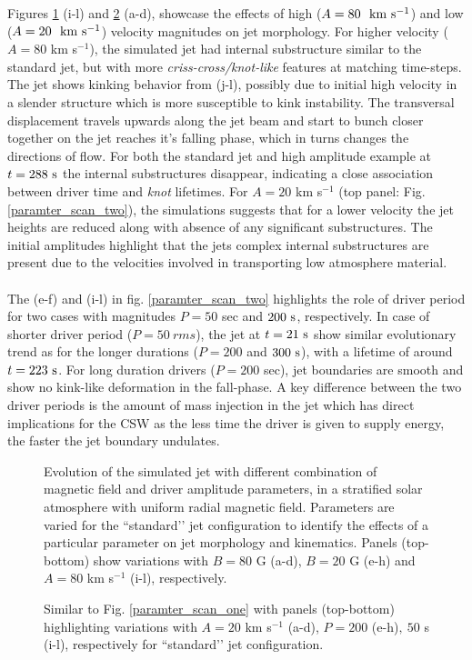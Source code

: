 \documentclass[12pt]{ociamthesis}
\newcommand{\fref}[1]{Fig. \eqref{#1}}
\newcommand{\kms}{~\rm{km ~s^{-1}}}
\newcommand{\np}{\\ \\}
\begin{document}
Figures \ref{paramter_scan_one} (i-l) and \ref{paramter_scan_two} (a-d), showcase the effects of high ($A = 80 ~\kms$) and low ($A = 20 ~\kms$) velocity magnitudes on jet morphology. For higher velocity ($A = 80$ km s$^{-1}$), the simulated jet had internal substructure similar to the standard jet, but with more \textit{criss-cross/knot-like} features at matching time-steps. The jet shows kinking behavior from (j-l), possibly due to initial high velocity in a slender structure which is more susceptible to kink instability. The transversal displacement travels upwards along the jet beam and start to bunch closer together on the jet reaches it's falling phase, which in turns changes the directions of flow. For both the standard jet and high amplitude example at $t = 288 ~\rm{s}$ the internal substructures disappear, indicating a close association between driver time and \textit{knot} lifetimes. For $A = 20$ km s$^{-1}$ (top panel: \fref{paramter_scan_two}), the simulations suggests that for a lower velocity the jet heights are reduced along with absence of any significant substructures. The initial amplitudes highlight that the jets complex internal substructures are present due to the velocities involved in transporting low atmosphere material. \np

The (e-f) and (i-l) in fig. \eqref{paramter_scan_two} highlights the role of driver period for two cases with magnitudes $P = 50$ sec and $200~\rm{s}$, respectively. In case of shorter driver period ($P = 50 ~rm{s}$), the jet at $t = 21~\rm{s}$ show similar evolutionary trend as for the longer durations ($P = 200$ and $300~\rm{s}$), with a lifetime of around $t = 223~\rm{s}$. For long duration drivers ($P = 200$ sec), jet boundaries are smooth and show no kink-like deformation in the fall-phase. A key difference between the two driver periods is the amount of mass injection in the jet which has direct implications for the CSW as the less time the driver is given to supply energy, the faster the jet boundary undulates.  
\begin{figure}
\captionsetup[subfigure]{labelformat=empty}
\centering
{} 
\caption{Evolution of the simulated jet with different combination of magnetic field and driver amplitude parameters, in a stratified solar atmosphere with uniform radial magnetic field. Parameters are varied for the ``standard’’ jet configuration to identify the effects of a particular parameter on jet morphology and kinematics. Panels (top-bottom) show variations with $B = 80$ G (a-d), $B = 20$ G  (e-h) and $A = 80$ km s$^{-1}$ (i-l), respectively.}
\label{paramter_scan_one}
\end{figure}
\begin{figure}
\captionsetup[subfigure]{labelformat=empty}
\centering
{} 
\caption{Similar to \fref{paramter_scan_one} with panels (top-bottom) highlighting variations with $A = 20$ km s$^{-1}$ (a-d), $P = 200$ (e-h)$,~50$ s (i-l), respectively for ``standard’’ jet configuration.}
\label{paramter_scan_two}
\end{figure}
\end{document}
